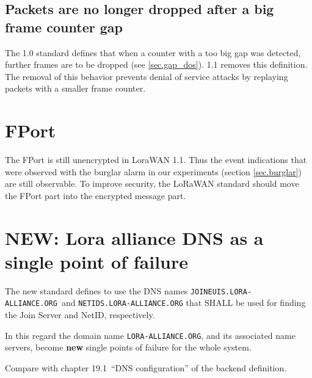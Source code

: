 {\subsection{Packets are no longer dropped after a big frame counter gap}

The 1.0 standard defines that when a counter with a too big gap
was detected, further frames are to be dropped (see \ref{sec.gap_dos}). 1.1 removes this
definition. The removal of this behavior prevents denial of service attacks by replaying
packets with a smaller frame counter.


\hypertarget{h.i6r97yb5iafg}{\section{\texorpdfstring{{FPort}}{FPort}}\label{h.i6r97yb5iafg}}

{The FPort is still unencrypted in LoraWAN 1.1. Thus the event
indications that were observed with the burglar alarm in our experiments (section \ref{sec.burglar})
are still observable. To improve security, the LoRaWAN standard should
move the FPort part into the encrypted message part.}

\section{NEW: Lora alliance DNS as a single point of failure}

The new standard defines to use the DNS names
\texttt{JOINEUIS.LORA-ALLIANCE.ORG}~and \texttt{NETIDS.LORA-ALLIANCE.ORG} that
SHALL be used for finding the Join Server and NetID, respectively.

In this regard the domain name \texttt{LORA-ALLIANCE.ORG}, and its associated name servers, become \textbf{new} single points of failure for the whole system.

{Compare with chapter 19.1~``DNS configuration'' of the backend
definition.}

}
